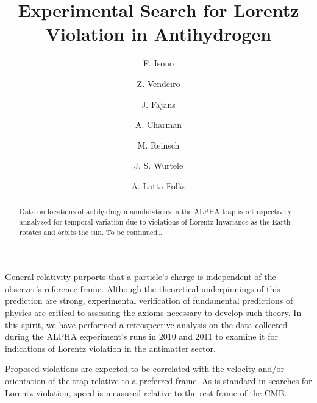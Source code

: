 \documentclass[superscriptaddress,aps,prb,11pt]{revtex4-1}
\begin{document}
\title{Experimental Search for Lorentz Violation in Antihydrogen}
\author{F. Isono}

\author{Z. Vendeiro}

\author{J. Fajans}

\author{A. Charman}

\author{M. Reinsch}

\author{J. S. Wurtele}

\author{A. Lotta-Folks}

\begin{abstract}
Data on locations of antihydrogen annihilations in the ALPHA trap is retrospectively annalyzed for temporal variation due to violations of Lorentz Invariance as the Earth rotates and orbits the sun.  To be continued\ldots
\end{abstract}

\maketitle

General relativity purports that a particle's charge is independent of the observer's reference frame.  Although the theoretical underpinnings of this prediction are strong, experimental verification of fundamental predictions of physics are critical to assessing the axioms necessary to develop such theory.  In this spirit, we have performed a retrospective analysis on the data collected during the ALPHA experiment's runs in 2010 and 2011 to examine it for indications of Lorentz violation in the antimatter sector.

Proposed violations are expected to be correlated with the velocity and/or orientation of the trap relative to a preferred frame.  As is standard in searches for Lorentz violation, speed is measured relative to the rest frame of the CMB.
\end{document}
